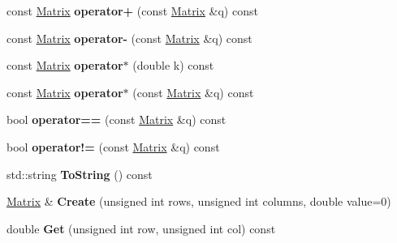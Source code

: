\begin{DoxyCompactItemize}
\item 
\hypertarget{classdfv_1_1Matrix_ae148d04cc81b2b5f818a09532eaec2f6}{const \hyperlink{classdfv_1_1Matrix}{\-Matrix} {\bfseries operator+} (const \hyperlink{classdfv_1_1Matrix}{\-Matrix} \&q) const }\label{classdfv_1_1Matrix_ae148d04cc81b2b5f818a09532eaec2f6}

\item 
\hypertarget{classdfv_1_1Matrix_a0479733c20cc950f900de2a18ec824f2}{const \hyperlink{classdfv_1_1Matrix}{\-Matrix} {\bfseries operator-\/} (const \hyperlink{classdfv_1_1Matrix}{\-Matrix} \&q) const }\label{classdfv_1_1Matrix_a0479733c20cc950f900de2a18ec824f2}

\item 
\hypertarget{classdfv_1_1Matrix_aef7b9b1396bb921dcd2f3c25cad6db51}{const \hyperlink{classdfv_1_1Matrix}{\-Matrix} {\bfseries operator$\ast$} (double k) const }\label{classdfv_1_1Matrix_aef7b9b1396bb921dcd2f3c25cad6db51}

\item 
\hypertarget{classdfv_1_1Matrix_a1abee67dc5d00111b6842d7c761d14ac}{const \hyperlink{classdfv_1_1Matrix}{\-Matrix} {\bfseries operator$\ast$} (const \hyperlink{classdfv_1_1Matrix}{\-Matrix} \&q) const }\label{classdfv_1_1Matrix_a1abee67dc5d00111b6842d7c761d14ac}

\item 
\hypertarget{classdfv_1_1Matrix_a31969b5300c94e92b1dacae1c2e58d5c}{bool {\bfseries operator==} (const \hyperlink{classdfv_1_1Matrix}{\-Matrix} \&q) const }\label{classdfv_1_1Matrix_a31969b5300c94e92b1dacae1c2e58d5c}

\item 
\hypertarget{classdfv_1_1Matrix_a2757a2bbd6a25c1380ffc192f8064b11}{bool {\bfseries operator!=} (const \hyperlink{classdfv_1_1Matrix}{\-Matrix} \&q) const }\label{classdfv_1_1Matrix_a2757a2bbd6a25c1380ffc192f8064b11}

\item 
\hypertarget{classdfv_1_1Matrix_a156b276550ab4558d8e0932579a7ab2a}{std\-::string {\bfseries \-To\-String} () const }\label{classdfv_1_1Matrix_a156b276550ab4558d8e0932579a7ab2a}

\item 
\hypertarget{classdfv_1_1Matrix_adc7cf08bcd951901d4be15601611641f}{\hyperlink{classdfv_1_1Matrix}{\-Matrix} \& {\bfseries \-Create} (unsigned int rows, unsigned int columns, double value=0)}\label{classdfv_1_1Matrix_adc7cf08bcd951901d4be15601611641f}

\item 
\hypertarget{classdfv_1_1Matrix_aaaec0f3bfe4f1538e115b3b5bf8db5bd}{double {\bfseries \-Get} (unsigned int row, unsigned int col) const }\label{classdfv_1_1Matrix_aaaec0f3bfe4f1538e115b3b5bf8db5bd}


\end{DoxyCompactItemize}
